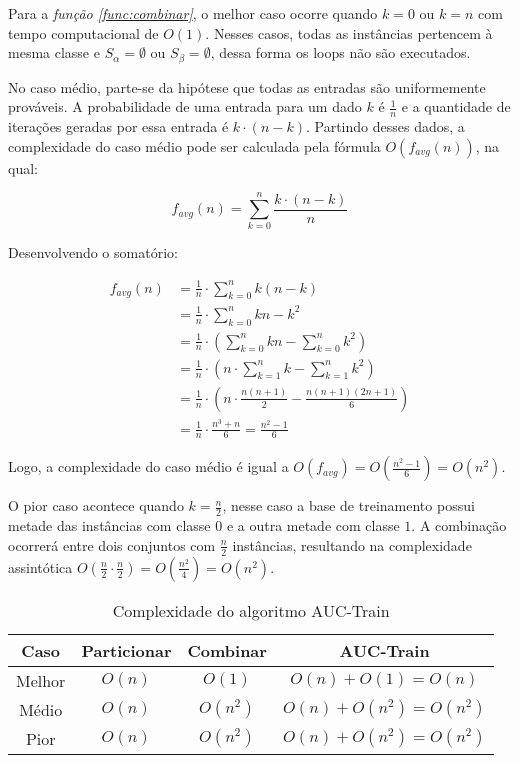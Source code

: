 Para a \emph{função \ref{func:combinar}}, o melhor caso ocorre quando $k = 0$ ou $k = n$ com tempo computacional de $O(1)$. Nesses casos, todas as instâncias pertencem à mesma classe e $S_{\alpha} = \emptyset$ ou $S_{\beta} = \emptyset$, dessa forma os loops não são executados.

No caso médio, parte-se da hipótese que todas as entradas são uniformemente prováveis. A probabilidade de uma entrada para um dado $k$ é $\frac{1}{n}$ e a quantidade de iterações geradas por essa entrada é $k \cdot (n - k)$. Partindo desses dados, a complexidade do caso médio pode ser calculada pela fórmula $O(f_{avg}(n))$, na qual:

\[f_{avg}(n) = \sum_{k = 0}^{n} \frac{k \cdot (n - k)}{n}\]

Desenvolvendo o somatório:

\begin{align*}
    f_{avg}(n) &= \frac{1}{n} \cdot \sum_{k = 0}^{n} k(n - k) \\
               &= \frac{1}{n} \cdot \sum_{k = 0}^{n} kn - k^2 \\
               &= \frac{1}{n} \cdot \left(\sum_{k = 0}^{n} kn - \sum_{k = 0}^{n} k^2\right) \\
               &= \frac{1}{n} \cdot \left(n \cdot \sum_{k = 1}^{n} k - \sum_{k = 1}^{n} k^2\right) \\
               &= \frac{1}{n} \cdot \left(n \cdot \frac{n(n + 1)}{2} - \frac{n(n + 1)(2n + 1)}{6}\right) \\
               &= \frac{1}{n} \cdot \frac{n^3 + n}{6} = \frac{n^2 -1}{6}
\end{align*}

Logo, a complexidade do caso médio é igual a $O(f_{avg}) = O(\frac{n^2 -1}{6}) = O(n^2)$.

O pior caso acontece quando $k = \frac{n}{2}$, nesse caso a base de treinamento possui metade das instâncias com classe $0$ e a outra metade com classe $1$. A combinação ocorrerá entre dois conjuntos com $\frac{n}{2}$ instâncias, resultando na complexidade assintótica $O(\frac{n}{2} \cdot \frac{n}{2}) = O(\frac{n^2}{4}) = O(n^2)$.

\begin{table}[h]
    \centering
    \begin{tabular}{ c | c c | c }
        \hline

        Caso & Particionar & Combinar & AUC-Train \\

        \hline

        Melhor & $O(n)$ & $O(1)$ & $O(n) + O(1) = O(n)$ \\
        Médio & $O(n)$ & $O(n^2)$ & $O(n) + O(n^2) = O(n^2)$ \\
        Pior  & $O(n)$ & $O(n^2)$ & $O(n) + O(n^2) = O(n^2)$ \\

        \hline
    \end{tabular}

    \caption{Complexidade do algoritmo AUC-Train}
    \label{auc-train-complexity}
\end{table}

